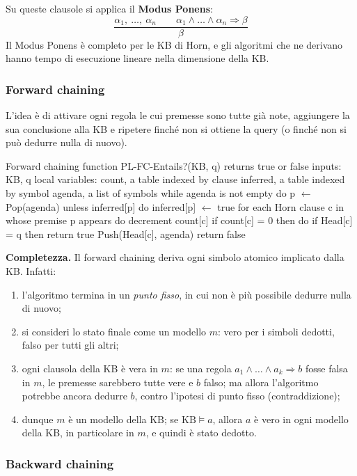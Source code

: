 \documentclass[11pt, a4paper]{article}
\renewcommand{\emph}[1]{\textcolor{verdechiaro}{\itshape #1}}
\newcommand{\KB}{\mathrm{KB}}
\begin{document}
Su queste clausole si applica il \textbf{Modus Ponens}:
\[
  \frac{\alpha_1,\ \dots,\ \alpha_n \qquad \alpha_1\land\dots\land\alpha_n\Rightarrow\beta}{\beta}
\]
Il Modus Ponens è completo per le KB di Horn, e gli algoritmi che ne derivano hanno tempo di esecuzione lineare nella dimensione della KB.

\subsubsection*{Forward chaining}

L'idea è di attivare ogni regola le cui premesse sono tutte già note, aggiungere la sua conclusione alla KB e ripetere finché non si ottiene la query (o finché non si può dedurre nulla di nuovo).

\begin{codice}{Forward chaining}
function PL-FC-Entails?(KB, q) returns true or false
  inputs: KB, q
  local variables: count, a table indexed by clause
                   inferred, a table indexed by symbol
                   agenda, a list of symbols
  while agenda is not empty do
    p $\leftarrow$ Pop(agenda)
    unless inferred[p] do
      inferred[p] $\leftarrow$ true
      for each Horn clause c in whose premise p appears do
        decrement count[c]
        if count[c] = 0 then do
          if Head[c] = q then return true
          Push(Head[c], agenda)
  return false
\end{codice}

\textbf{Completezza.} Il forward chaining deriva ogni simbolo atomico implicato dalla KB. Infatti:
\begin{enumerate}
  \item l'algoritmo termina in un \emph{punto fisso}, in cui non è più possibile dedurre nulla di nuovo;
  \item si consideri lo stato finale come un modello $m$: vero per i simboli dedotti, falso per tutti gli altri;
  \item ogni clausola della KB è vera in $m$: se una regola $a_1\land\dots\land a_k\Rightarrow b$ fosse falsa in $m$, le premesse sarebbero tutte vere e $b$ falso; ma allora l'algoritmo potrebbe ancora dedurre $b$, contro l'ipotesi di punto fisso (contraddizione);
  \item dunque $m$ è un modello della KB; se $\KB\models a$, allora $a$ è vero in ogni modello della KB, in particolare in $m$, e quindi è stato dedotto.
\end{enumerate}

\subsubsection*{Backward chaining}
\end{document}
